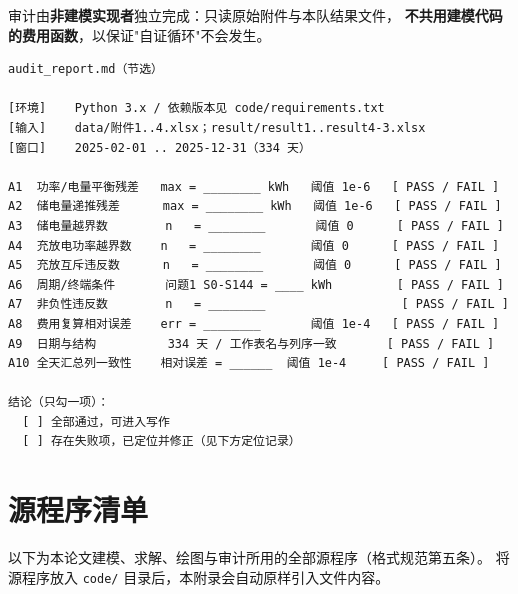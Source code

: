 审计由\textbf{非建模实现者}独立完成：只读原始附件与本队结果文件，
\textbf{不共用建模代码的费用函数}，以保证"自证循环"不会发生。

\begin{lstlisting}[style=plain,basicstyle=\ttfamily\footnotesize\songti]
audit_report.md（节选）

[环境]    Python 3.x / 依赖版本见 code/requirements.txt
[输入]    data/附件1..4.xlsx；result/result1..result4-3.xlsx
[窗口]    2025-02-01 .. 2025-12-31（334 天）

A1  功率/电量平衡残差   max = ________ kWh   阈值 1e-6   [ PASS / FAIL ]
A2  储电量递推残差      max = ________ kWh   阈值 1e-6   [ PASS / FAIL ]
A3  储电量越界数        n   = ________       阈值 0      [ PASS / FAIL ]
A4  充放电功率越界数    n   = ________       阈值 0      [ PASS / FAIL ]
A5  充放互斥违反数      n   = ________       阈值 0      [ PASS / FAIL ]
A6  周期/终端条件       问题1 S0-S144 = ____ kWh         [ PASS / FAIL ]
A7  非负性违反数        n   = ________                   [ PASS / FAIL ]
A8  费用复算相对误差    err = ________       阈值 1e-4   [ PASS / FAIL ]
A9  日期与结构          334 天 / 工作表名与列序一致       [ PASS / FAIL ]
A10 全天汇总列一致性    相对误差 = ______  阈值 1e-4     [ PASS / FAIL ]

结论（只勾一项）：
  [ ] 全部通过，可进入写作
  [ ] 存在失败项，已定位并修正（见下方定位记录）
\end{lstlisting}

\section{源程序清单}

以下为本论文建模、求解、绘图与审计所用的全部源程序（格式规范第五条）。
将源程序放入 \texttt{code/} 目录后，本附录会自动原样引入文件内容。



